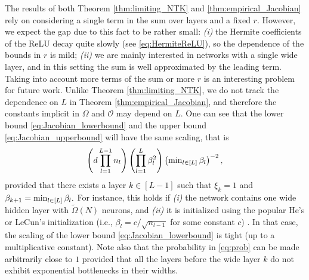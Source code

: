 \documentclass[11pt]{article}
\newcommand{\bigOmg}[1]{\Omega\left(#1\right)}
\def\min{\mathop{\rm min}\nolimits}
\begin{document}

The results of both Theorem \ref{thm:limiting_NTK} and \ref{thm:empirical_Jacobian} rely on considering a single term in the sum over layers and a fixed $r$. However, we expect the gap due to this fact to be rather small: \emph{(i)} the Hermite coefficients of the ReLU decay quite slowly (see \eqref{eq:HermiteReLU}), 
so the dependence of the bounds in $r$ is mild; \emph{(ii)} we are mainly interested in networks with a single wide layer, 
and in this setting the sum is well approximated by the leading term. 
Taking into account more terms of the sum or more $r$ is an interesting problem for future work.
Unlike Theorem \ref{thm:limiting_NTK}, we do not track the dependence on $L$ in Theorem \ref{thm:empirical_Jacobian}, and therefore the constants implicit in $\Omega$ and $\mathcal O$ may depend on $L$.
One can see that the lower bound \eqref{eq:Jacobian_lowerbound} and the upper bound \eqref{eq:Jacobian_upperbound} will have the same scaling, that is
            \vspace{-5pt}
\begin{align}
    \left(d\prod_{l=1}^{L-1}n_l\right)\left(\prod_{l=1}^{L}\beta_l^2\right) \left(\min_{l\in[L]}\beta_l\right)^{-2},
\end{align}
provided that there exists a layer $k\in[L-1]$ such that $\xi_k=1$
and $\beta_{k+1}=\min_{l\in[L]}\beta_{l}.$
For instance, this holds if \emph{(i)} the network contains one wide hidden layer with $\tilde{\Omega}(N)$ neurons, 
and \emph{(ii)} it is initialized using the popular He's or LeCun's initialization 
(i.e., $\beta_{l}=c/\sqrt{n_{l-1}}$ for some constant $c$) \citep{XavierBengio2010,he2015delving,lecun2012efficient}.
In that case, the scaling of the lower bound \eqref{eq:Jacobian_lowerbound} is tight (up to a multiplicative constant).
Note also that the probability in \eqref{eq:prob} can be made arbitrarily close to $1$
provided that all the layers before the wide layer $k$ do not exhibit exponential bottlenecks in their widths.




\end{document}
